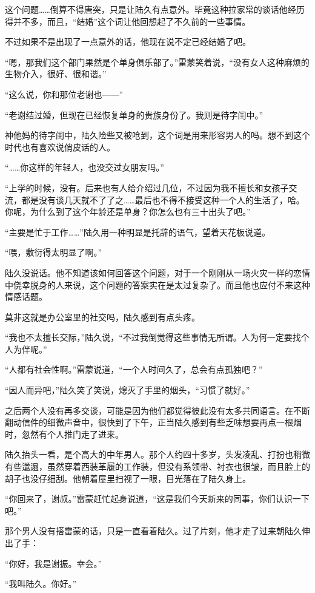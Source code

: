这个问题……倒算不得唐突，只是让陆久有点意外。毕竟这种拉家常的谈话他经历得并不多，而且，“结婚”这个词让他回想起了不久前的一些事情。

不过如果不是出现了一点意外的话，他现在说不定已经结婚了吧。

“嗯，那我们这个部门果然是个单身俱乐部了。”雷蒙笑着说，“没有女人这种麻烦的生物介入，很好、很和谐。”

“这么说，你和那位老谢也——”

“老谢结过婚，但现在已经恢复单身的贵族身份了。我则是待字闺中。”

神他妈的待字闺中，陆久险些又被呛到，这个词是用来形容男人的吗。想不到这个时代也有喜欢说俏皮话的人。

“……你这样的年轻人，也没交过女朋友吗。”

“上学的时候，没有。后来也有人给介绍过几位，不过因为我不擅长和女孩子交流，都是没有谈几天就不了了之……最后也不得不接受这种一个人的生活了，哈。你呢，为什么到了这个年龄还是单身？你怎么也有三十出头了吧。”

“主要是忙于工作……”陆久用一种明显是托辞的语气，望着天花板说道。

“喂，敷衍得太明显了啊。”

陆久没说话。他不知道该如何回答这个问题，对于一个刚刚从一场火灾一样的恋情中侥幸脱身的人来说，这个问题的答案实在是太过复杂了。而且他也应付不来这种情感话题。

莫非这就是办公室里的社交吗，陆久感到有点头疼。

“我也不太擅长交际，”陆久说，“不过我倒觉得这些事情无所谓。人为何一定要找个人为伴呢。”

“人都有社会性啊。”雷蒙说道，“一个人时间久了，总会有点孤独吧？”

“因人而异吧，”陆久笑了笑说，熄灭了手里的烟头，“习惯了就好。”

之后两个人没有再多交谈，可能是因为他们都觉得彼此没有太多共同语言。在不断翻动信件的细微声音中，很快到了下午，正当陆久感到有些乏味想要再点一根烟时，忽然有个人推门走了进来。

陆久抬头一看，是个高大的中年男人。那个人约四十多岁，头发凌乱、打扮也稍微有些邋遢，虽然穿着西装革履的工作装，但没有系领带、衬衣也很皱，而且脸上的胡子也没仔细刮。他朝着屋里扫视了一眼，目光落在了陆久身上。

“你回来了，谢叔。”雷蒙赶忙起身说道，“这是我们今天新来的同事，你们认识一下吧。”

那个男人没有搭雷蒙的话，只是一直看着陆久。过了片刻，他才走了过来朝陆久伸出了手：

“你好，我是谢振。幸会。”

“我叫陆久。你好。”

